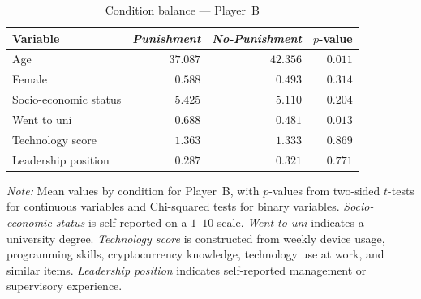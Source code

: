 \begin{table}[!htbp]
    \centering
    \caption{Condition balance --- Player~B}
    \label{tab:treatment_balance_B}
    \begin{tabular}{l|rrr}
                  Variable &  \textit{Punishment} &  \textit{No-Punishment} &  $p$-value \\ \hline
                           Age &  $37.087$ &  $42.356$ &  $0.011$ \\
                        Female &  $0.588$ &  $0.493$ &  $0.314$ \\
         Socio-economic status &  $5.425$ &  $5.110$ &  $0.204$ \\
                   Went to uni &  $0.688$ &  $0.481$ &  $0.013$ \\
              Technology score &  $1.363$ &  $1.333$ &  $0.869$ \\
           Leadership position &  $0.287$ &  $0.321$ &  $0.771$ \\
    \end{tabular}
    \begin{minipage}{0.95\textwidth}\footnotesize
    \textit{Note:} Mean values by condition for Player~B, with $p$-values from two-sided $t$-tests for continuous variables and Chi-squared tests for binary variables. \textit{Socio-economic status} is self-reported on a $1$--$10$ scale. \textit{Went to uni} indicates a university degree. \textit{Technology score} is constructed from weekly device usage, programming skills, cryptocurrency knowledge, technology use at work, and similar items. \textit{Leadership position} indicates self-reported management or supervisory experience.
    \end{minipage}
\end{table}
